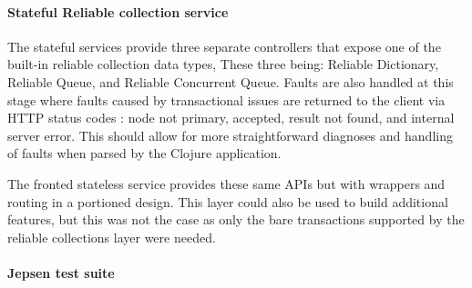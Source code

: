 \documentclass[a4paper,10pt,titlepage]{report}
\begin{document}
    \paragraph*{Stateful Reliable collection service}

    The stateful services provide three separate controllers that expose one of the built-in reliable collection data types, These three being: Reliable Dictionary, Reliable Queue, and Reliable Concurrent Queue. Faults are also handled at this stage where faults caused by transactional issues are returned to the client via HTTP status codes \cite{wikihttpstatuscodes}: node not primary, accepted, result not found, and internal server error. This should allow for more straightforward diagnoses and handling of faults when parsed by the Clojure application.

    The fronted stateless service provides these same APIs but with wrappers and routing in a portioned design. This layer could also be used to build additional features, but this was not the case as only the bare transactions supported by the reliable collections layer were needed.

    \paragraph*{Jepsen test suite}
    
\end{document}
